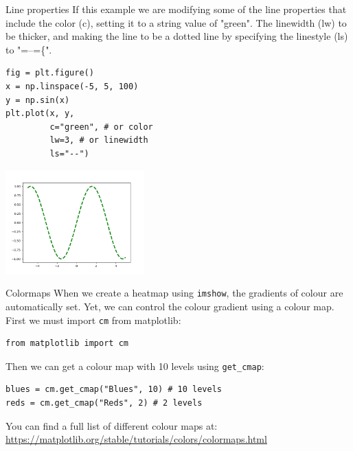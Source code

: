 \documentclass[10pt]{beamer}
\begin{document}
\begin{frame}[label={sec:org1fb6e6f},fragile]{Line properties}
 If this example we are modifying some of the line properties that include the
color (c), setting it to a string value of "green". The linewidth (lw) to be
thicker, and making the line to be a dotted line by specifying the linestyle
(ls) to "=--=\{".

\begin{verbatim}
fig = plt.figure()
x = np.linspace(-5, 5, 100)
y = np.sin(x)
plt.plot(x, y,
         c="green", # or color
         lw=3, # or linewidth
         ls="--")
\end{verbatim}

\begin{center}
\includegraphics[width=0.4\textwidth]{images/linestyles.png}
\end{center}
\end{frame}

\begin{frame}[label={sec:orga03360c},fragile]{Colormaps}
 When we create a heatmap using \texttt{imshow}, the gradients of colour are automatically
set. Yet, we can control the colour gradient using a colour map. First we must
import \texttt{cm} from matplotlib:

\begin{verbatim}
from matplotlib import cm
\end{verbatim}

Then we can get a colour map with 10 levels using \texttt{get\_cmap}:

\begin{verbatim}
blues = cm.get_cmap("Blues", 10) # 10 levels
reds = cm.get_cmap("Reds", 2) # 2 levels
\end{verbatim}

You can find a full list of different colour maps at: \url{https://matplotlib.org/stable/tutorials/colors/colormaps.html}
\end{frame}
\end{document}
